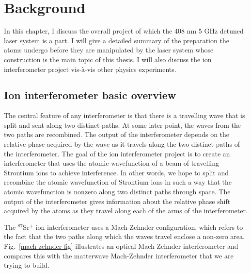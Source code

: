 
\chapter{Background}
In this chapter, I discuss the overall project of which the 408 nm 5 GHz detuned laser system is a part. I will give a detailed summary of the preparation the atoms undergo before they are manipulated by the laser system whose construction is the main topic of this thesis. I will also discuss the ion interferometer project vis-\`a-vis other physics experiments.

\section{Ion interferometer basic overview}
The central feature of any interferometer is that there is a travelling wave that is split and sent along two distinct paths. At some later point, the waves from the two paths are recombined. The output of the interferometer depends on the relative phase acquired by the wave as it travels along the two distinct paths of the interferometer.
The goal of the ion interferometer project is to create an interferometer that uses the atomic wavefunction of a beam of travelling Strontium ions to achieve interference.
In other words, we hope to split and recombine the atomic wavefunction of Strontium ions in such a way that the atomic wavefunction is nonzero along two distinct paths through space. 
The output of the interferometer gives information about the relative phase shift acquired by the atoms as they travel along each of the arms of the interferometer. 

The $^{87}$Sr$^+$ ion interferometer uses a Mach-Zehnder configuration, which refers to the fact that the two paths along which the waves travel enclose a non-zero area. Fig.\ \ref{mach-zehnder-fig} illustrates an optical Mach-Zehnder interferometer and compares this with the matterwave Mach-Zehnder interferometer that we are trying to build.

